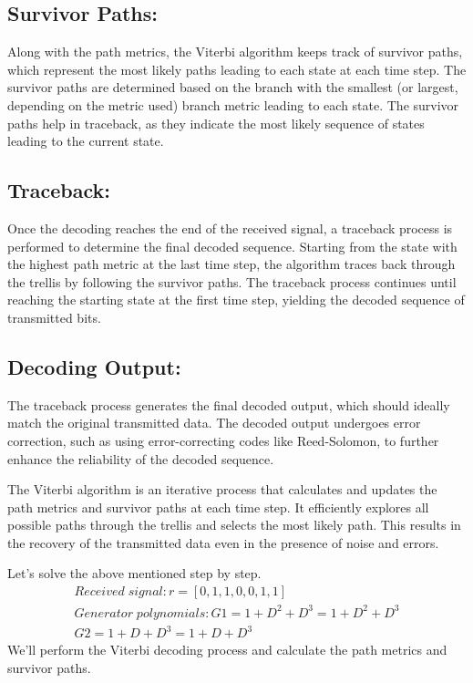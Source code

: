 \subsection{Survivor Paths:}
Along with the path metrics, the Viterbi algorithm keeps track of survivor paths, which represent the most likely paths leading to each state at each time step.
The survivor paths are determined based on the branch with the smallest (or largest, depending on the metric used) branch metric leading to each state.
The survivor paths help in traceback, as they indicate the most likely sequence of states leading to the current state.

\subsection{Traceback:}
Once the decoding reaches the end of the received signal, a traceback process is performed to determine the final decoded sequence.
Starting from the state with the highest path metric at the last time step, the algorithm traces back through the trellis by following the survivor paths.
The traceback process continues until reaching the starting state at the first time step, yielding the decoded sequence of transmitted bits.

\subsection{Decoding Output:}
The traceback process generates the final decoded output, which should ideally match the original transmitted data.
The decoded output undergoes error correction, such as using error-correcting codes like Reed-Solomon, to further enhance the reliability of the decoded sequence.

The Viterbi algorithm is an iterative process that calculates and updates the path metrics and survivor paths at each time step. It efficiently explores all possible paths through the trellis and selects the most likely path. This results in the recovery of the transmitted data even in the presence of noise and errors.

Let's solve the above mentioned step by step.
\begin{align}
Received\; signal : 
r = [0, 1, 1, 0, 0, 1, 1]\\
Generator\; polynomials :
G1 = 1 + D^2 + D^3 = 1 + D^2 + D^3\\
G2 = 1 + D + D^3 = 1 + D + D^3
\end{align}
We'll perform the Viterbi decoding process and calculate the path metrics and survivor paths.

